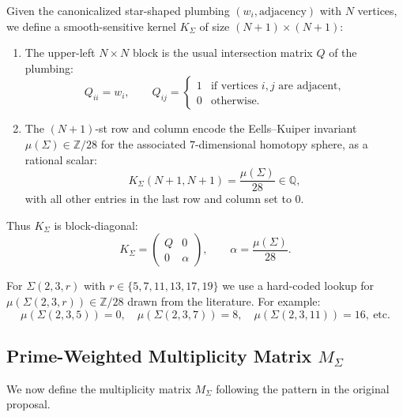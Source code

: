 \documentclass[11pt]{article}
\begin{document}
Given the canonicalized star-shaped plumbing $(w_i, \text{adjacency})$ with $N$ vertices, we define a smooth-sensitive kernel $K_\Sigma$ of size $(N+1)\times(N+1)$:

\begin{enumerate}[label=(\alph*),leftmargin=1.5em]
  \item The upper-left $N\times N$ block is the usual intersection matrix $Q$ of the plumbing:
  \[
    Q_{ii} = w_i,\qquad
    Q_{ij} = \begin{cases} 1 & \text{if vertices }i,j\text{ are adjacent,}\\
                           0 & \text{otherwise.}
             \end{cases}
  \]
  \item The $(N+1)$-st row and column encode the Eells--Kuiper invariant $\mu(\Sigma)\in\mathbb Z/28$ for the associated $7$-dimensional homotopy sphere, as a rational scalar:
  \[
    K_\Sigma(N+1,N+1) = \frac{\mu(\Sigma)}{28}\in\mathbb Q,
  \]
  with all other entries in the last row and column set to $0$.
\end{enumerate}

Thus $K_\Sigma$ is block-diagonal:
\[
  K_\Sigma = 
  \begin{pmatrix}
    Q & 0 \\[0.3em]
    0 & \alpha
  \end{pmatrix},
  \qquad \alpha = \frac{\mu(\Sigma)}{28}.
\]

For $\Sigma(2,3,r)$ with $r\in\{5,7,11,13,17,19\}$ we use a hard-coded lookup for $\mu(\Sigma(2,3,r))\in\mathbb Z/28$ drawn from the literature.\cite{exotic-mult} For example:
\[
  \mu(\Sigma(2,3,5)) = 0,\quad
  \mu(\Sigma(2,3,7)) = 8,\quad
  \mu(\Sigma(2,3,11)) = 16,\ \text{etc.}
\]

\subsection{Prime-Weighted Multiplicity Matrix \texorpdfstring{$M_\Sigma$}{MΣ}}

We now define the multiplicity matrix $M_\Sigma$ following the pattern in the original proposal.\cite{exotic-mult}
\end{document}

